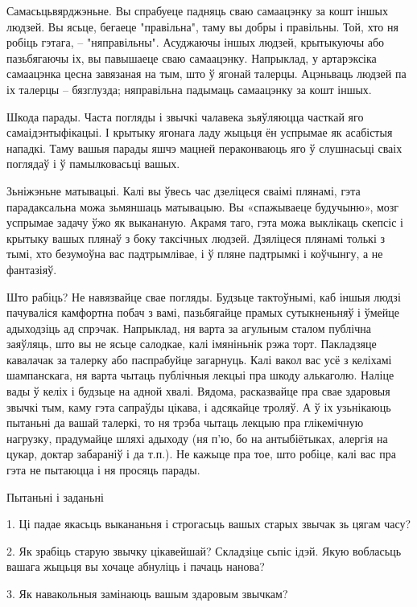 Самасьцьвярджэньне. Вы спрабуеце падняць сваю самаацэнку за кошт іншых людзей. Вы ясьце, бегаеце "правільна", таму вы добры і правільны. Той, хто ня робіць гэтага, -- "няправільны". Асуджаючы іншых людзей, крытыкуючы або пазьбягаючы іх, вы павышаеце сваю самаацэнку. Напрыклад, у артарэксіка самаацэнка цесна завязаная на тым, што ў ягонай талерцы. Ацэньваць людзей па іх талерцы – бязглузда; няправільна падымаць самаацэнку за кошт іншых.

Шкода парады. Часта погляды і звычкі чалавека зьяўляюцца часткай яго самаідэнтыфікацыі. І крытыку ягонага ладу жыцьця ён успрымае як асабістыя нападкі. Таму вашыя парады яшчэ мацней пераконваюць яго ў слушнасьці сваіх поглядаў і ў памылковасьці вашых.

Зьніжэньне матывацыі. Калі вы ўвесь час дзеліцеся сваімі плянамі, гэта парадаксальна можа зьмяншаць матывацыю. Вы «спажываеце будучыню», мозг успрымае задачу ўжо як выкананую. Акрамя таго, гэта можа выклікаць скепсіс і крытыку вашых плянаў з боку таксічных людзей. Дзяліцеся плянамі толькі з тымі, хто безумоўна вас падтрымлівае, і ў пляне падтрымкі і коўчынгу, а не фантазіяў.

Што рабіць? Не навязвайце свае погляды. Будзьце тактоўнымі, каб іншыя людзі пачуваліся камфортна побач з вамі, пазьбягайце прамых сутыкненьняў і ўмейце адыходзіць ад спрэчак. Напрыклад, ня варта за агульным сталом публічна заяўляць, што вы не ясьце салодкае, калі імяніньнік рэжа торт. Пакладзяце кавалачак за талерку або паспрабуйце загарнуць. Калі вакол вас усё з келіхамі шампанскага, ня варта чытаць публічныя лекцыі пра шкоду алькаголю. Наліце вады ў келіх і будзьце на адной хвалі. Вядома, расказвайце пра свае здаровыя звычкі тым, каму гэта сапраўды цікава, і адсякайце троляў. А ў іх узьнікаюць пытаньні да вашай талеркі, то ня трэба чытаць лекцыю пра глікемічную нагрузку, прадумайце шляхі адыходу (ня п'ю, бо на антыбіётыках, алергія на цукар, доктар забараніў і да т.п.). Не кажыце пра тое, што робіце, калі вас пра гэта не пытаюцца і ня просяць парады.

Пытаньні і заданьні

1. Ці падае якасьць выкананьня і строгасьць вашых старых звычак зь цягам часу?

2. Як зрабіць старую звычку цікавейшай? Складзіце сьпіс ідэй. Якую вобласьць вашага жыцьця вы хочаце абнуліць і пачаць нанова?

3. Як навакольныя замінаюць вашым здаровым звычкам?